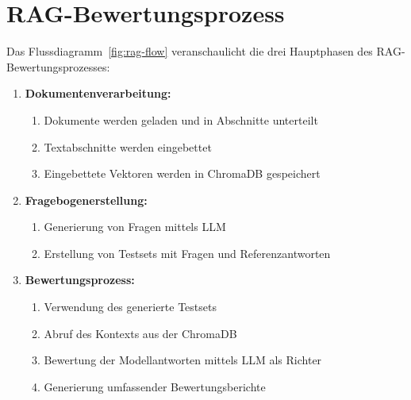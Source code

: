 \section{RAG-Bewertungsprozess}

Das Flussdiagramm~\ref{fig:rag-flow} veranschaulicht die drei Hauptphasen des RAG-Bewertungsprozesses:

\begin{enumerate}
    \item \textbf{Dokumentenverarbeitung:}
    \begin{enumerate}
        \item Dokumente werden geladen und in Abschnitte unterteilt
        \item Textabschnitte werden eingebettet
        \item Eingebettete Vektoren werden in ChromaDB gespeichert
    \end{enumerate}
    
    \item \textbf{Fragebogenerstellung:}
    \begin{enumerate}
        \item Generierung von Fragen mittels LLM
        \item Erstellung von Testsets mit Fragen und Referenzantworten
    \end{enumerate}
    
    \item \textbf{Bewertungsprozess:}
    \begin{enumerate}
        \item Verwendung des generierte Testsets
        \item Abruf des Kontexts aus der ChromaDB
        \item Bewertung der Modellantworten mittels LLM als Richter
        \item Generierung umfassender Bewertungsberichte
    \end{enumerate}
\end{enumerate}


